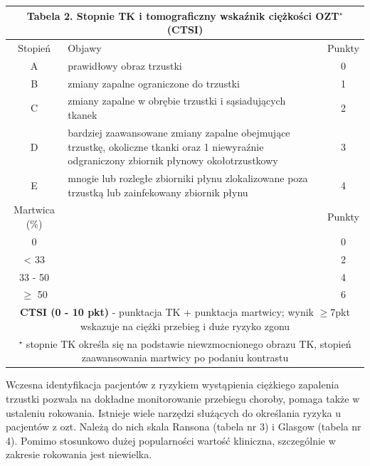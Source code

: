 \documentclass[a4paper, 12pt]{report}
\begin{document}
\begin{table}[htbp]
\begin{center}
\begin{footnotesize}
\begin{tabular}{|c p{9cm} c|}
\hline
\multicolumn{3}{|c|}{\cellcolor[gray]{0.9} \textbf{Tabela 2. Stopnie TK i tomograficzny
  wskaźnik ciężkości OZT$^\star$ (CTSI)}}\\
\hline \hline
Stopień & Objawy & Punkty\\
\hline \hline
A & prawidłowy obraz trzustki & 0\\
\hline
B & zmiany zapalne ograniczone do trzustki & 1\\
\hline
C & zmiany zapalne w obrębie trzustki i sąsiadujących tkanek & 2\\
\hline
D & bardziej zaawansowane zmiany zapalne obejmujące trzustkę,
    okoliczne tkanki oraz 1 niewyraźnie odgraniczony zbiornik płynowy
    okołotrzustkowy & 3\\
\hline
E & mnogie lub rozległe zbiorniki płynu zlokalizowane poza trzustką
    lub zainfekowany zbiornik płynu & 4\\
\hline \hline
Martwica (\%) & & Punkty\\
\hline \hline
0 & & 0\\
< 33 & & 2\\
33 - 50 & & 4\\
$\geq$ 50 & & 6\\
\hline \hline
\multicolumn {3}{|p{13cm}|}{\textbf{CTSI (0 - 10 pkt)} - punktacja TK + punktacja
  martwicy; wynik $\geq$7pkt wskazuje na ciężki przebieg i duże ryzyko
  zgonu}\\
\hline
\multicolumn {3}{|p{13cm}|}{\scriptsize{$^\star$ stopnie TK określa się
  na podstawie niewzmocnionego obrazu TK, stopień zaawansowania martwicy po podaniu
  kontrastu}}\\
\hline
\end{tabular}
\end{footnotesize}
\end{center}
\end{table}

Wczesna identyfikacja pacjentów z ryzykiem wystąpienia ciężkiego
zapalenia trzustki pozwala na dokładne monitorowanie przebiegu
choroby, pomaga także w ustaleniu rokowania. Istnieje wiele narzędzi
służących do określania ryzyka u pacjentów z ozt. Należą do nich skala
Ransona (tabela nr 3) i Glasgow (tabela nr 4). Pomimo stosunkowo dużej
popularności wartość kliniczna, szczególnie w zakresie rokowania jest
niewielka.
\end{document}
